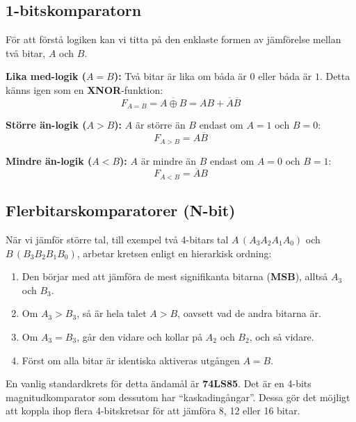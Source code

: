 \documentclass[
  swedish,
  letterpaper,
  oneside,
  openany]{book}
\providecommand{\tightlist}{%
  \setlength{\itemsep}{0pt}\setlength{\parskip}{0pt}}
\begin{document}
\subsection{1-bitskomparatorn}\label{bitskomparatorn}

För att förstå logiken kan vi titta på den enklaste formen av jämförelse
mellan två bitar, \(A\) och \(B\).

\textbf{Lika med-logik (\(A = B\)):} Två bitar är lika om båda är \(0\)
eller båda är \(1\). Detta känns igen som en \textbf{XNOR}-funktion:
\[F_{A=B} = \overline{A \oplus B} = AB + \overline{A}\overline{B}\]

\textbf{Större än-logik (\(A > B\)):} \(A\) är större än \(B\) endast om
\(A=1\) och \(B=0\): \[F_{A>B} = A\overline{B}\]

\textbf{Mindre än-logik (\(A < B\)):} \(A\) är mindre än \(B\) endast om
\(A=0\) och \(B=1\): \[F_{A<B} = \overline{A}B\]

\subsection{Flerbitarskomparatorer
(N-bit)}\label{flerbitarskomparatorer-n-bit}

När vi jämför större tal, till exempel två 4-bitars tal
\(A \, (A_3 A_2 A_1 A_0)\) och \(B \, (B_3 B_2 B_1 B_0)\), arbetar
kretsen enligt en hierarkisk ordning:

\begin{enumerate}
\def\labelenumi{\arabic{enumi}.}
\tightlist
\item
  Den börjar med att jämföra de mest signifikanta bitarna
  (\textbf{MSB}), alltså \(A_3\) och \(B_3\).
\item
  Om \(A_3 > B_3\), så är hela talet \(A > B\), oavsett vad de andra
  bitarna är.
\item
  Om \(A_3 = B_3\), går den vidare och kollar på \(A_2\) och \(B_2\),
  och så vidare.
\item
  Först om alla bitar är identiska aktiveras utgången \(A = B\).
\end{enumerate}

\begin{tcolorbox}[enhanced jigsaw, arc=.35mm, bottomrule=.15mm, bottomtitle=1mm, breakable, colback=white, colbacktitle=quarto-callout-tip-color!10!white, colframe=quarto-callout-tip-color-frame, coltitle=black, left=2mm, leftrule=.75mm, opacityback=0, opacitybacktitle=0.6, rightrule=.15mm, title=\textcolor{quarto-callout-tip-color}{\faLightbulb}\hspace{0.5em}{Visste du?}, titlerule=0mm, toprule=.15mm, toptitle=1mm]

En vanlig standardkrets för detta ändamål är \textbf{74LS85}. Det är en
4-bits magnitudkomparator som dessutom har ``kaskadingångar''. Dessa gör
det möjligt att koppla ihop flera 4-bitskretsar för att jämföra 8, 12
eller 16 bitar.

\end{tcolorbox}
\end{document}
